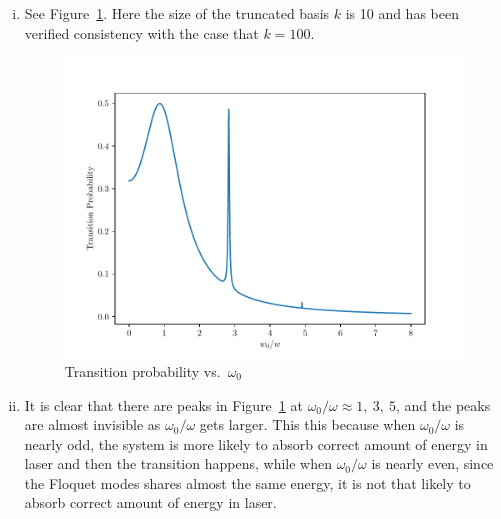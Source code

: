 \documentclass{article}
\begin{document}
\begin{enumerate}[1.]
\begin{enumerate}[(i)]
    \item See Figure~\ref{fig:q3-transition}. Here the size of the truncated basis $k$ is 10 and has been verified consistency with the case that $k=100$. 
    \begin{figure}[H]
      \centering
      \includegraphics[width=0.6\linewidth]{q3-transition.pdf}
      \caption{Transition probability vs.\ $\omega_0$}
      \label{fig:q3-transition}
    \end{figure}
    \item 
    It is clear that there are peaks in Figure~\ref{fig:q3-transition} at $\omega_0/\omega \approx 1,\ 3,\ 5$, and the peaks are almost invisible as $\omega_0/\omega$ gets larger.
    This this because when $\omega_0/\omega$ is nearly odd, the system is more likely to absorb correct amount of energy in laser and then the transition happens, while when $\omega_0/\omega$ is nearly even, since the Floquet modes shares almost the same energy, it is not that likely to absorb correct amount of energy in laser.
  \end{enumerate}


\end{enumerate}
\end{document}
